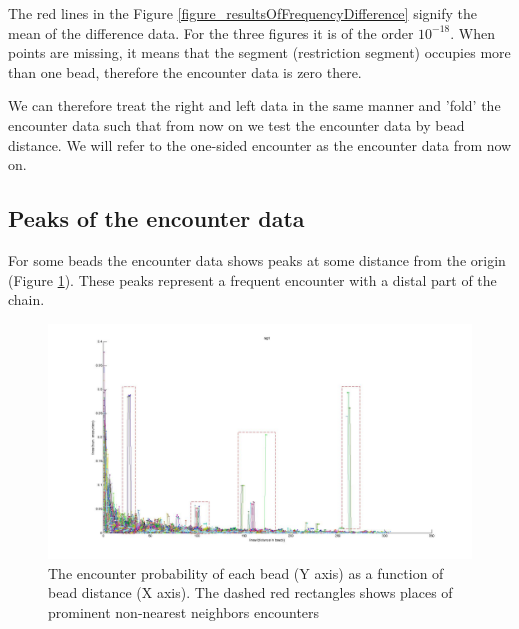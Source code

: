 \documentclass[12pt]{book}
\begin{document}
The red lines in the Figure \ref{figure_resultsOfFrequencyDifference} signify the mean of the difference data. For the three figures it is of the order $10^{-18}$. When points are missing, it means that the segment (restriction segment) occupies more than one bead, therefore the encounter data is zero there. 

We can therefore treat the right and left data in the same manner and 'fold' the encounter data such that from now on we test the encounter data by bead distance. We will refer to the one-sided encounter as the encounter data from now on. 

\subsection{Peaks of the encounter data}\label{subsection_peaksOfTheEncounterData}
For some beads the encounter data shows peaks at some distance from the origin (Figure \ref{figure_peaksOfTheEncounterProbabiltity307Beads}). 
These peaks represent a frequent encounter with a distal part of the chain. 

\begin{figure}[H]
\includegraphics*[scale=0.2]{EncounterFrequenciesByDistanceRep1}
\caption{\scriptsize{The encounter probability of each bead (Y axis) as a function of bead distance (X axis). The dashed red rectangles shows places of prominent non-nearest neighbors encounters}}
\label{figure_peaksOfTheEncounterProbabiltity307Beads}
\end{figure}
\end{document}
